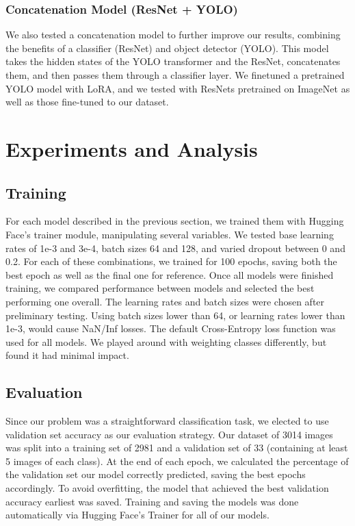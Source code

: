 \documentclass{article}
\begin{document}
\begin{multicols}{2}
\subsubsection*{Concatenation Model (ResNet + YOLO)}
We also tested a concatenation model to further improve our results, combining the benefits of a classifier (ResNet) and object detector (YOLO). This model takes the hidden states of the YOLO transformer and the ResNet, concatenates them, and then passes them through a classifier layer. We finetuned a pretrained YOLO model with LoRA, and we tested with ResNets pretrained on ImageNet as well as those fine-tuned to our dataset.

\section*{Experiments and Analysis}

\subsection*{Training}
For each model described in the previous section, we trained them with Hugging Face’s trainer module, manipulating several variables. We tested base learning rates of 1e-3 and 3e-4, batch sizes 64 and 128, and varied dropout between 0 and 0.2. For each of these combinations, we trained for 100 epochs, saving both the best epoch as well as the final one for reference. Once all models were finished training, we compared performance between models and selected the best performing one overall. The learning rates and batch sizes were chosen after preliminary testing. Using batch sizes lower than 64, or learning rates lower than 1e-3, would cause NaN/Inf losses. The default Cross-Entropy loss function was used for all models. We played around with weighting classes differently, but found it had minimal impact.

\subsection*{Evaluation}

Since our problem was a straightforward classification task, we elected to use validation set accuracy as our evaluation strategy. Our dataset of 3014 images was split into a training set of 2981 and a validation set of 33 (containing at least 5 images of each class). At the end of each epoch, we calculated the percentage of the validation set our model correctly predicted, saving the best epochs accordingly. To avoid overfitting, the model that achieved the best validation accuracy earliest was saved. Training and saving the models was done automatically via Hugging Face’s Trainer for all of our models.


\end{multicols}
\end{document}
